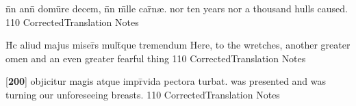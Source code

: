 \latline
  {n\={}n ann\={\macron {\i}} domu\={}re decem, n\={}n m\={\macron {\i}}lle car\={\macron {\i}}n{\ae}.}
  { nor ten years nor a thousand hulls caused. }
  {110}
  { CorrectedTranslation }
  { Notes }


\latline
  {H\={\macron {\i}}c aliud majus miser\={\macron {\i}}s mult\={}que tremendum}
  { Here, to the wretches, another greater omen and an even greater fearful thing }
  {110}
  { CorrectedTranslation }
  { Notes }


\latline
  {[\textbf{200}] objicitur magis atque impr\={}vida pectora turbat.}
  { was presented and was turning our unforeseeing breasts. }
  {110}
  { CorrectedTranslation }
  { Notes }


